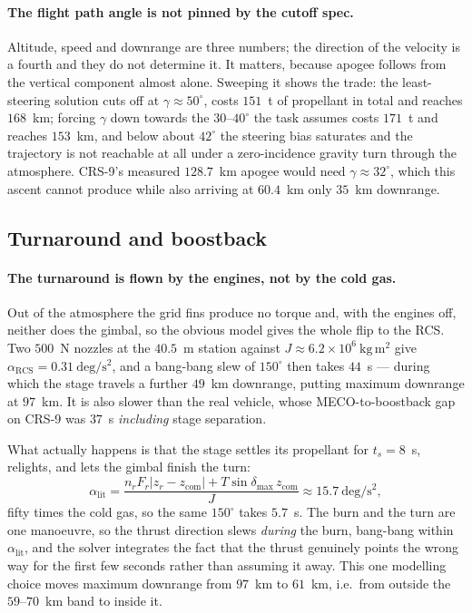 \documentclass[11pt,a4paper]{article}
\begin{document}
\paragraph{The flight path angle is not pinned by the cutoff spec.} Altitude,
speed and downrange are three numbers; the direction of the velocity is a fourth
and they do not determine it. It matters, because apogee follows from the
vertical component almost alone. Sweeping it shows the trade: the least-steering
solution cuts off at $\gamma\approx50^\circ$, costs $151$~t of propellant in
total and reaches $168$~km; forcing $\gamma$ down towards the $30$--$40^\circ$
the task assumes costs $171$~t and reaches $153$~km, and below about $42^\circ$
the steering bias saturates and the trajectory is not reachable at all under a
zero-incidence gravity turn through the atmosphere. CRS-9's measured $128.7$~km
apogee would need $\gamma\approx32^\circ$, which this ascent cannot produce while
also arriving at $60.4$~km only $35$~km downrange.

\subsection{Turnaround and boostback}

\paragraph{The turnaround is flown by the engines, not by the cold gas.} Out of
the atmosphere the grid fins produce no torque and, with the engines off, neither
does the gimbal, so the obvious model gives the whole flip to the RCS. Two
$500$~N nozzles at the $40.5$~m station against $J\approx6.2\times10^6\
\mathrm{kg\,m^2}$ give $\alpha_{\mathrm{RCS}}=0.31\ \mathrm{deg/s^2}$, and a
bang-bang slew of $150^\circ$ then takes $44$~s --- during which the stage
travels a further $49$~km downrange, putting maximum downrange at $97$~km. It is
also slower than the real vehicle, whose MECO-to-boostback gap on CRS-9 was
$37$~s \emph{including} stage separation.

What actually happens is that the stage settles its propellant for
$t_s=8$~s, relights, and lets the gimbal finish the turn:
\begin{equation}
\alpha_{\mathrm{lit}}
 = \frac{n_r F_r\lvert z_r - z_{\mathrm{com}}\rvert + T\sin\delta_{\max}\,z_{\mathrm{com}}}{J}
 \approx 15.7\ \mathrm{deg/s^2},
\end{equation}
fifty times the cold gas, so the same $150^\circ$ takes $5.7$~s. The burn and the
turn are one manoeuvre, so the thrust direction slews \emph{during} the burn,
bang-bang within $\alpha_{\mathrm{lit}}$, and the solver integrates the fact that
the thrust genuinely points the wrong way for the first few seconds rather than
assuming it away. This one modelling choice moves maximum downrange from $97$~km
to $61$~km, i.e.\ from outside the $59$--$70$~km band to inside it.
\end{document}
